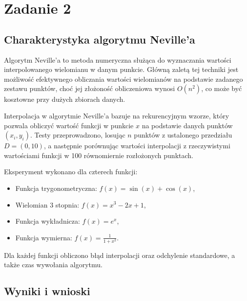 \section{Zadanie 2}

\subsection{Charakterystyka algorytmu Neville'a}

Algorytm Neville'a to metoda numeryczna służąca do wyznaczania wartości interpolowanego wielomianu w danym punkcie. Główną zaletą tej techniki jest możliwość efektywnego obliczania wartości wielomianów na podstawie zadanego zestawu punktów, choć jej złożoność obliczeniowa wynosi \( O(n^2) \), co może być kosztowne przy dużych zbiorach danych.

Interpolacja w algorytmie Neville'a bazuje na rekurencyjnym wzorze, który pozwala obliczyć wartość funkcji w punkcie \( x \) na podstawie danych punktów \( (x_i, y_i) \). Testy przeprowadzono, losując \( n \) punktów z ustalonego przedziału \( D = (0, 10) \), a następnie porównując wartości interpolacji z rzeczywistymi wartościami funkcji w 100 równomiernie rozłożonych punktach.

Eksperyment wykonano dla czterech funkcji:
\begin{itemize}
    \item Funkcja trygonometryczna: \( f(x) = \sin(x) + \cos(x) \),
    \item Wielomian 3 stopnia: \( f(x) = x^3 - 2x + 1 \),
    \item Funkcja wykładnicza: \( f(x) = e^x \),
    \item Funkcja wymierna: \( f(x) = \frac{1}{1 + x^2} \).
\end{itemize}

Dla każdej funkcji obliczono błąd interpolacji oraz odchylenie standardowe, a także czas wywołania algorytmu.

\subsection{Wyniki i wnioski}

